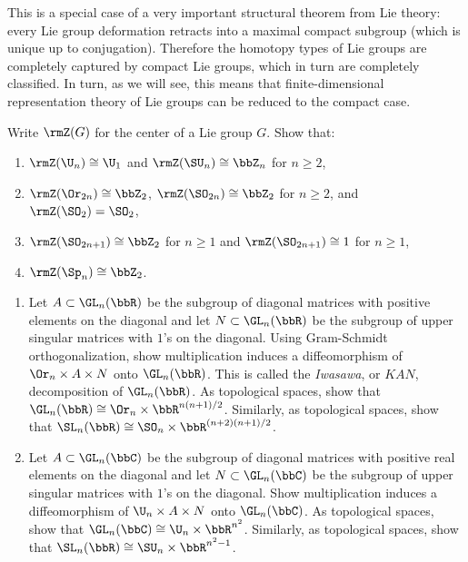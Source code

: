 This is a special case of a very important structural theorem from Lie theory: every Lie group deformation retracts into a maximal compact subgroup (which is unique up to conjugation). Therefore the homotopy types of Lie groups are completely captured by compact Lie groups, which in turn are completely classified. In turn, as we will see, this means that finite-dimensional representation theory of Lie groups can be reduced to the compact case.


\begin{xca}
    Write $\rmZ(G)$ for the center of a Lie group $G$. Show that:
    \begin{enumerate}[label=(\alph*)]
        \item $\rmZ(\U_n)\cong \U_1$ and $\rmZ(\SU_n)\cong \bbZ_n$ for $n\geq 2$,
        \item $\rmZ(\Or_{2n})\cong \bbZ_2$, $\rmZ(\SO_{2n})\cong \bbZ_2$ for $n\geq 2$, and $\rmZ(\SO_2)=\SO_2$,
        \item $\rmZ(\SO_{2n+1})\cong \bbZ_2$ for $n\geq 1$ and $\rmZ(\SO_{2n+1})\cong 1$ for $n\geq 1$,
        \item $\rmZ(\Sp_n)\cong \bbZ_2$.
    \end{enumerate}
\end{xca}
\begin{xca}
    \begin{enumerate}[label=(\alph*)]
        \item Let $A\subset \GL_n(\bbR)$ be the subgroup of diagonal matrices with positive elements on the diagonal and let $N\subset \GL_n(\bbR)$ be the subgroup of upper singular matrices with $1$'s on the diagonal. Using Gram-Schmidt orthogonalization, show multiplication induces a diffeomorphism of $\Or_n\times A\times N$ onto $\GL_n(\bbR)$. This is called the \emph{Iwasawa}, or $KAN$, decomposition of $\GL_n(\bbR)$. As topological spaces, show that $\GL_n(\bbR)\cong\Or_n\times\bbR^{n(n+1)/2}$. Similarly, as topological spaces, show that $\SL_n(\bbR)\cong \SO_n\times\bbR^{(n+2)(n+1)/2}$.
        \item Let $A\subset \GL_n(\bbC)$ be the subgroup of diagonal matrices with positive real elements on the diagonal and let $N\subset \GL_n(\bbC)$ be the subgroup of upper singular matrices with $1$'s on the diagonal. Show multiplication induces a diffeomorphism of $\U_n\times A\times N$ onto $\GL_n(\bbC)$. As topological spaces, show that $\GL_n(\bbC)\cong\U_n\times\bbR^{n^2}$. Similarly, as topological spaces, show that $\SL_n(\bbR)\cong \SU_n\times\bbR^{n^2-1}$.
    \end{enumerate}
\end{xca}

